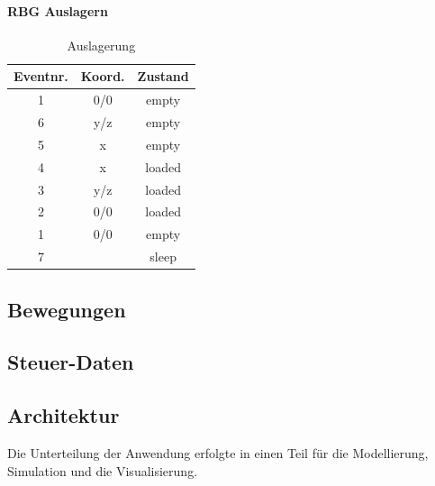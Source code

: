 \paragraph{RBG Auslagern}

\begin{table}[H]
  \caption{Auslagerung}
  \label{tab:outs}

  \begin{center}
    \begin{tabular}{ccc}
		Eventnr.&	Koord.&	Zustand\\
		\hline
		1 &			0/0 	&empty\\
		6 &			y/z 	&empty\\
		5 &			x 		&empty\\
		4 &			x 		&loaded\\
		3 &			y/z 	&loaded\\
		2 &			0/0 	&loaded\\
		1	&		0/0		&empty\\
		7 &					&sleep \\
    \end{tabular}
  \end{center}
\end{table}	
%
\subsection{Bewegungen}



%
\subsection{Steuer-Daten}

%
\subsection{Architektur}
Die Unterteilung der Anwendung erfolgte in einen Teil für die Modellierung, Simulation und die Visualisierung.  





